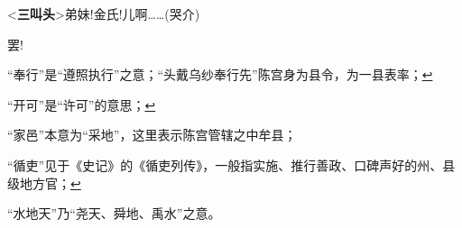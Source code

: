 \textless{}\textbf{三叫头}\textgreater{}弟妹!金氏!儿啊\ldots{}\ldots{}(哭介)

罢!

\item
  \leavevmode\hypertarget{fn136}{}%
  ``奉行''是``遵照执行''之意；``头戴乌纱奉行先''陈宫身为县令，为一县表率；\protect\hyperlink{fnref136}{↩}
\item
  \leavevmode\hypertarget{fn137}{}%
  ``开可''是``许可''的意思；\protect\hyperlink{fnref137}{↩}
\item
  \leavevmode\hypertarget{fn138}{}%
  ``家邑''本意为``采地''，这里表示陈宫管辖之中牟县；

  ``循吏''见于《史记》的《循吏列传》，一般指实施、推行善政、口碑声好的州、县级地方官；\protect\hyperlink{fnref138}{↩}
\item
  \leavevmode\hypertarget{fn139}{}%
  ``水地天''乃``尧天、舜地、禹水''之意。

